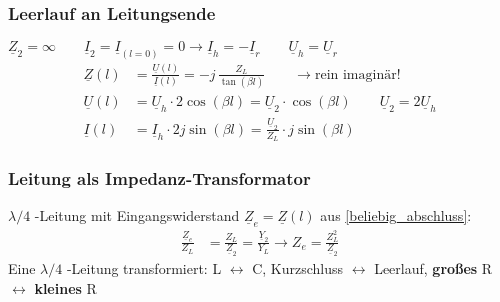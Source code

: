 \subsubsection{Leerlauf an Leitungsende}
$ \underline{Z}_2 = \infty \qquad \underline{I}_2 = \underline{I}_{(l=0)} = 0 \rightarrow \underline{I}_h = - \underline{I}_r \qquad \underline{U}_h = \underline{U}_r $
\begin{align*}
	\underline{Z}(l) & = \frac{\underline{U}(l)}{\underline{I}(l)}  = -j \,\frac{Z_L}{\tan(\beta l)}\qquad\rightarrow \text{rein imaginär!}                 \\
		\underline{U}(l) & = \underline{U}_h \cdot 2 \cos(\beta l) = \underline{U}_2 \cdot \cos(\beta l) \qquad \underline{U}_2 = 2\underline{U}_h\\
	\underline{I}(l)         & = \underline{I}_h\cdot 2j\sin(\beta l) = \frac{\underline{U}_2}{Z_L} \cdot  j \sin(\beta l)
\end{align*}

\subsubsection{Leitung als Impedanz-Transformator}
$\lambda / 4$ -Leitung mit Eingangswiderstand $ \underline{Z}_e = \underline{Z}(l) $ aus  \ref{beliebig_abschluss}:
\begin{align*}
	\frac{\underline{Z}_e}{Z_L} & = \frac{Z_L}{\underline{Z}_2} = \frac{\underline{Y}_2}{Y_L} \rightarrow Z_e = \frac{Z^2_L}{\underline{Z}_2}
\end{align*}
Eine $ \lambda / 4 $ -Leitung transformiert:
L $ \leftrightarrow $ C, Kurzschluss $ \leftrightarrow $ Leerlauf, \textbf{großes} R $ \leftrightarrow$ \textbf{kleines} R

%
%


